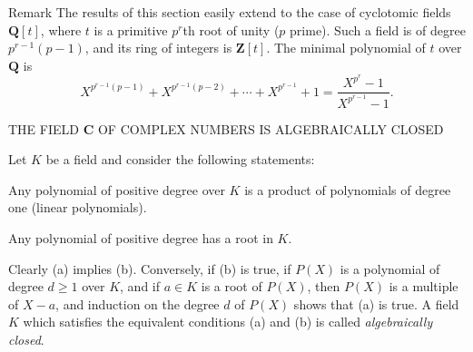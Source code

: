 \begin{statement}{Remark}
The results of this section easily extend to the case of cyclotomic fields
$\mathbf{Q}[t]$, where $t$ is a primitive $p^{r}$th root of unity ($p$
prime). Such a field is of degree $p^{r-1}(p-1)$, and its ring of integers is
$\mathbf{Z}[t]$. The minimal polynomial of $t$ over $\mathbf{Q}$ is
\[
X^{p^{r-1}(p-1)}+X^{p^{r-1}(p-2)}+\cdots+X^{p^{r-1}}+1
=\frac{X^{p^{r}}-1}{X^{p^{r-1}}-1}.
\]
\end{statement}

%
          {THE FIELD $\mathbf{C}$ OF COMPLEX NUMBERS IS ALGEBRAICALLY CLOSED}

Let $K$ be a field and consider the following statements:
\begin{alist}
\item Any polynomial of positive degree over $K$ is a product of
polynomials of degree one (linear polynomials).
\item Any polynomial of positive degree has a root in $K$.
\end{alist}
Clearly (a) implies (b). Conversely, if (b) is true, if $P(X)$ is a
polynomial of degree $d\geq1$ over $K$, and if $a\in K$ is a root of $P(X)$,
then $P(X)$ is a multiple of $X-a$, and induction on the degree $d$ of
$P(X)$ shows that (a) is true. A field $K$ which satisfies the equivalent
conditions (a) and (b) is called \emph{algebraically closed}.

